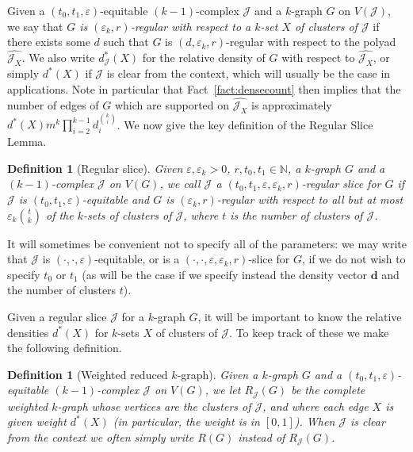 \documentclass[12pt,a4paper]{amsart}
\let\eps\varepsilon
\newtheorem{definition}[theorem] {Definition}
\newcommand{\NATS}{\mathbb{N}}
\newcommand{\cJ}{\mathcal{J}}
\newcommand{\reld}{d^*}
\begin{document}
Given a $(t_0,t_1,\eps)$-equitable $(k-1)$-complex $\cJ$ and a
$k$-graph $G$ on $V(\cJ)$, we say that \emph{$G$ is $(\eps_k,r)$-regular with respect to a $k$-set $X$ of clusters of $\cJ$} if there exists some $d$ such
that $G$ is $(d,\eps_k,r)$-regular with respect to the polyad $\hat{\cJ_X}$. We
also write $\reld_\cJ(X)$ for the relative density of $G$ with respect to
$\hat{\cJ_X}$, or simply $\reld(X)$ if $\cJ$ is clear from the context, which will usually be the case in applications. 
Note in particular that Fact~\ref{fact:densecount} then implies
that the number of edges of $G$ which are supported on $\hat{\cJ_X}$ is
approximately $\reld(X) m^k \prod_{i = 2}^{k-1} d_i^{\binom{k}{i}}$. We now give
the key definition of the Regular Slice Lemma.

\begin{definition}[Regular slice] Given $\eps,\eps_k>0$,
$r,t_0,t_1\in\NATS$, a $k$-graph $G$ and a $(k-1)$-complex $\cJ$ on $V(G)$, we
call $\cJ$ a $(t_0,t_1,\eps,\eps_k,r)$-regular slice for $G$ if
$\cJ$ is $(t_0,t_1,\eps)$-equitable and $G$ is $(\eps_k,r)$-regular with respect to all but at most
$\eps_k\binom{t}{k}$ of the $k$-sets of clusters of $\cJ$, where $t$ is the number of clusters of $\cJ$.
\end{definition}

  It will sometimes be convenient not to specify all of the parameters: we may
  write that $\cJ$ is $(\cdot, \cdot, \eps)$-equitable, or is a $(\cdot,\cdot,\eps,\eps_k,r)$-slice for 
$G$, if we do not wish to specify $t_0$ or $t_1$ (as will be the
  case if we specify instead the density vector $\mathbf{d}$ and the number of clusters $t$).

Given a regular slice $\cJ$ for a $k$-graph $G$, it will be important to know the
relative densities $\reld(X)$ for $k$-sets $X$ of clusters of $\cJ$. To keep track of these we make the following definition.

\begin{definition}[Weighted reduced $k$-graph]
 Given a $k$-graph $G$ and a $(t_0, t_1, \eps)$-equitable
 $(k-1)$-complex $\cJ$ on $V(G)$, we let $R_\cJ(G)$ be the complete weighted $k$-graph whose
 vertices are the clusters of $\cJ$, and where each edge $X$ is given weight $\reld(X)$
 (in particular, the weight is in $[0,1]$). When $\cJ$ is clear from the context we often simply write $R(G)$ instead of $R_\cJ(G)$. 
\end{definition}
\end{document}
